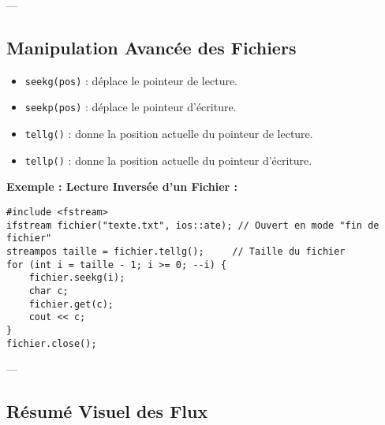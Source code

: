 ---

\subsection{ Manipulation Avancée des Fichiers}
\begin{itemize}
    \item \texttt{seekg(pos)} : déplace le pointeur de lecture.
    \item \texttt{seekp(pos)} : déplace le pointeur d'écriture.
    \item \texttt{tellg()} : donne la position actuelle du pointeur de lecture.
    \item \texttt{tellp()} : donne la position actuelle du pointeur d'écriture.
\end{itemize}

\textbf{Exemple : Lecture Inversée d'un Fichier :}
\begin{tcolorbox}[colframe=blue!50!black, colback=blue!5!white, title=Exemple de Lecture Inversée d'un Fichier]
\begin{verbatim}
#include <fstream>
ifstream fichier("texte.txt", ios::ate); // Ouvert en mode "fin de fichier"
streampos taille = fichier.tellg();     // Taille du fichier
for (int i = taille - 1; i >= 0; --i) {
    fichier.seekg(i);
    char c;
    fichier.get(c);
    cout << c;
}
fichier.close();
\end{verbatim}
\end{tcolorbox}

---

\subsection{ Résumé Visuel des Flux}
\begin{center}
\end{center}
